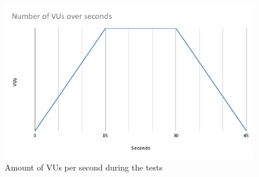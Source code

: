 \begin{figure}[H]
    \includegraphics[width=\columnwidth]{figures/pictures/vusPerSecond.png}
    \caption{Amount of VUs per second during the tests}
    \label{fig:vusPerSecond}
\end{figure}
